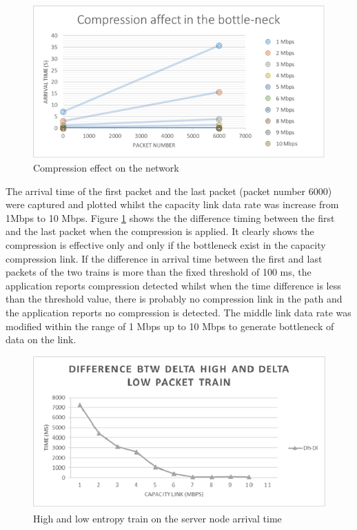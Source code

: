 \documentclass[sigconf]{acmart}
\begin{document}
 \begin{figure}[h]
  \centering
  \includegraphics[width=\linewidth]{2}
  \caption{Compression effect on the network}
  \label{f2}
\end{figure} 


The arrival time of the first packet and the last packet (packet number 6000) were captured and plotted whilst the capacity link data rate was increase from 1Mbps to 10 Mbps. Figure \ref{f2} shows the the difference timing between the first and the last packet when the compression is applied. It clearly shows the compression is effective only and only if the bottleneck exist in the capacity compression link. 
If the difference in arrival time between the first and last packets of the two trains is more than the fixed threshold of 100 ms, the application reports compression detected whilst when the time difference is less than the threshold value, there is probably no compression link in the path and the application reports no compression is detected. The middle link data rate was modified within the range of 1 Mbps up to 10 Mbps to generate bottleneck of data on the link. 

 \begin{figure}[h]
  \centering
  \includegraphics[width=\linewidth]{3}
  \caption{High and low entropy train on the server node arrival time }
  \label{t1}
\end{figure} 
\end{document}
